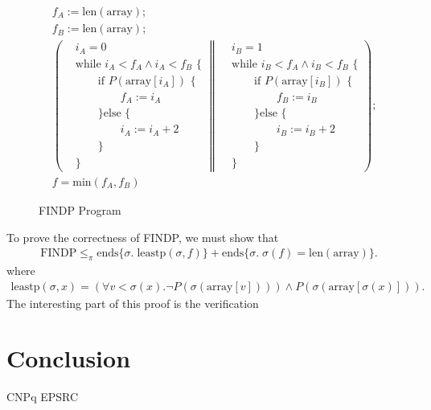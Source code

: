 \documentclass{llncs}
\begin{document}
\begin{figure}
\[
\begin{aligned}
&f_A := \text{len}(\text{array});\\
&f_B := \text{len}(\text{array});\\
&\left(
\begin{aligned}
&i_A = 0\\
&\text{while } i_A < f_A \land i_A < f_B \text{ \{ }\\
&\qquad\text{if } P(\text{array}[i_A]) \text{ \{}\\
&\qquad\qquad f_A := i_A\\
&\qquad\text{\} else \{}\\
&\qquad\qquad i_A := i_A + 2\\
&\qquad\text{\}}\\
&\text{\}}
\end{aligned}
\middle\|
\begin{aligned}
&i_B = 1\\
&\text{while } i_B < f_A \land i_B < f_B \text{ \{}\\
&\qquad\text{if } P(\text{array}[i_B]) \text{ \{}\\
&\qquad\qquad f_B := i_B\\
&\qquad\text{\} else \{}\\
&\qquad\qquad i_B := i_B + 2\\
&\qquad\text{\}}\\
&\text{\}}
\end{aligned}
\right);\\
&f = \text{min}(f_A,f_B)
\end{aligned}
\]
\caption{FINDP Program}
\label{fig:findp}
\end{figure}

To prove the correctness of FINDP, we must show that
\begin{align*}
\text{FINDP} \le_\pi \text{ends}\{\sigma.\; \text{leastp}(\sigma, f)\} + \text{ends}\{\sigma.\; \sigma(f) = \text{len}(\text{array})\}.
\end{align*}
where
\begin{align*}
\text{leastp}(\sigma, x) =  (\forall v<\sigma(x). \lnot P(\sigma(\text{array}[v])))\land P(\sigma(\text{array}[\sigma(x)])).
\end{align*}
The interesting part of this proof is the verification 

\newpage
\section{Conclusion}

CNPq EPSRC

{}

\end{document}
